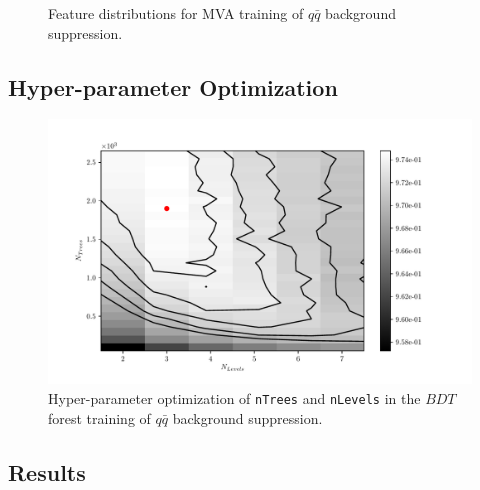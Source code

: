 \begin{figure}[H]
\caption{Feature distributions for MVA training of $q\bar q$ background suppression.}
\end{figure}

\subsection{Hyper-parameter Optimization}

\begin{figure}[H]
\centering
\captionsetup{width=0.8\linewidth}
\includegraphics[width=\linewidth]{fig/addendums/QQcC_hpo}
\caption{Hyper-parameter optimization of \texttt{\footnotesize nTrees} and \texttt{\footnotesize nLevels} in the $BDT$ forest training of $q\bar q$ background suppression.}
\end{figure}

\subsection{Results}


